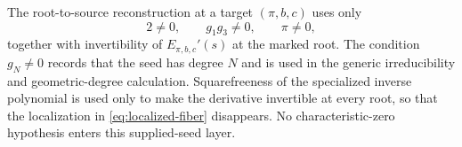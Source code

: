 \begin{remark}
\label{rem:supplied-hypotheses}
The root-to-source reconstruction at a target
\((\pi,b,c)\) uses only
\[
 2\neq0,\qquad g_1g_3\neq0,\qquad \pi\neq0,
\]
together with invertibility of \(E_{\pi,b,c}'(s)\) at the marked root.
The condition \(g_N\neq0\) records that the seed has degree \(N\) and is used
in the generic irreducibility and geometric-degree calculation.
Squarefreeness of the specialized inverse polynomial is used only to make
the derivative invertible at every root, so that the localization in
\eqref{eq:localized-fiber} disappears.  No characteristic-zero hypothesis
enters this supplied-seed layer.
\end{remark}


